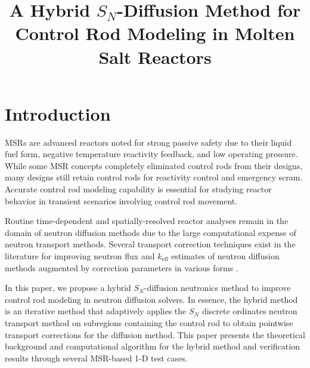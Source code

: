 \documentclass[letterpaper]{mc2025}
\title{A Hybrid $S_N$-Diffusion Method for Control Rod Modeling in Molten Salt Reactors}
\begin{document}
\section{Introduction}\label{sec:1}

\glspl*{MSR} are advanced reactors noted for strong passive safety due to their liquid fuel form,
negative temperature reactivity feedback, and low operating pressure. While some \gls*{MSR} concepts
completely eliminated control rods from their designs, many designs still retain control rods for
reactivity control and emergency scram. Accurate control rod modeling capability is essential for
studying reactor behavior in transient scenarios involving control rod movement.

Routine time-dependent and spatially-resolved reactor analyses remain in the domain of neutron
diffusion methods due to the large computational expense of neutron transport methods. Several
transport correction techniques exist in the literature for improving neutron flux and
$k_\text{eff}$ estimates of neutron diffusion methods augmented by correction parameters in
various forms
\cite{ronen_accurate_2004, pounders_diffusion_2009, kavenoky_sph_1978, fen_modelling_1992,
tamang_multilevel_2014, koebke_new_1980}.

In this paper, we propose a hybrid $S_N$-diffusion neutronics method to improve control rod
modeling in neutron diffusion solvers. In essence, the hybrid method is an iterative method that
adaptively applies the $S_N$ discrete ordinates neutron transport method on subregions containing
the control rod to obtain pointwise transport corrections for the diffusion method.
This paper presents the theoretical background and computational algorithm for the hybrid method
and verification results through several \gls*{MSR}-based 1-D test cases.
\end{document}

